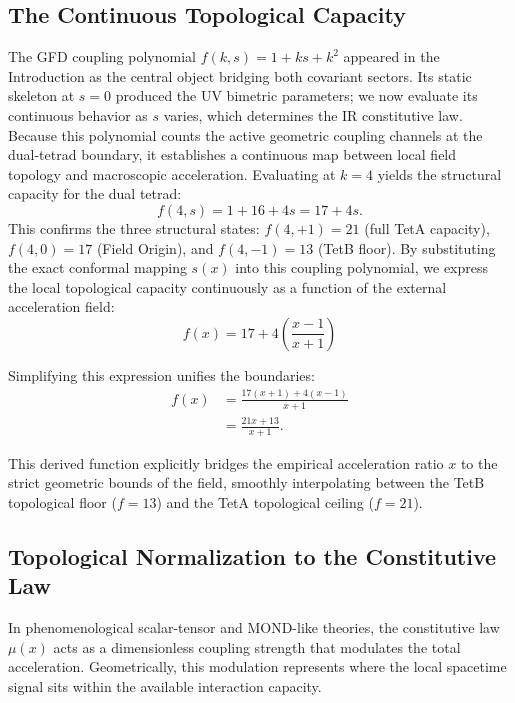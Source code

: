 \documentclass[twocolumn]{iopjournal}
\begin{document}
\subsection*{The Continuous Topological Capacity}
The GFD coupling polynomial $f(k, s) = 1 + ks + k^2$ appeared in the Introduction as the central object bridging both covariant sectors. Its static skeleton at $s = 0$ produced the UV bimetric parameters; we now evaluate its continuous behavior as $s$ varies, which determines the IR constitutive law. Because this polynomial counts the active geometric coupling channels at the dual-tetrad boundary, it establishes a continuous map between local field topology and macroscopic acceleration. Evaluating at $k = 4$ yields the structural capacity for the dual tetrad:
\begin{equation}
f(4, s) = 1 + 16 + 4s = 17 + 4s.
\end{equation}
This confirms the three structural states: $f(4,+1) = 21$ (full TetA capacity), $f(4,0) = 17$ (Field Origin), and $f(4,-1) = 13$ (TetB floor). By substituting the exact conformal mapping $s(x)$ into this coupling polynomial, we express the local topological capacity continuously as a function of the external acceleration field:
\begin{equation}
f(x) = 17 + 4\left(\frac{x - 1}{x + 1}\right)
\end{equation}

Simplifying this expression unifies the boundaries:
\begin{align}
f(x) &= \frac{17(x + 1) + 4(x - 1)}{x + 1} \nonumber \\
&= \frac{21x + 13}{x + 1}.
\end{align}

This derived function explicitly bridges the empirical acceleration ratio $x$ to the strict geometric bounds of the field, smoothly interpolating between the TetB topological floor ($f = 13$) and the TetA topological ceiling ($f = 21$).

\subsection*{Topological Normalization to the Constitutive Law}
In phenomenological scalar-tensor and MOND-like theories, the constitutive law $\mu(x)$ acts as a dimensionless coupling strength that modulates the total acceleration. Geometrically, this modulation represents where the local spacetime signal sits within the available interaction capacity.
\end{document}
